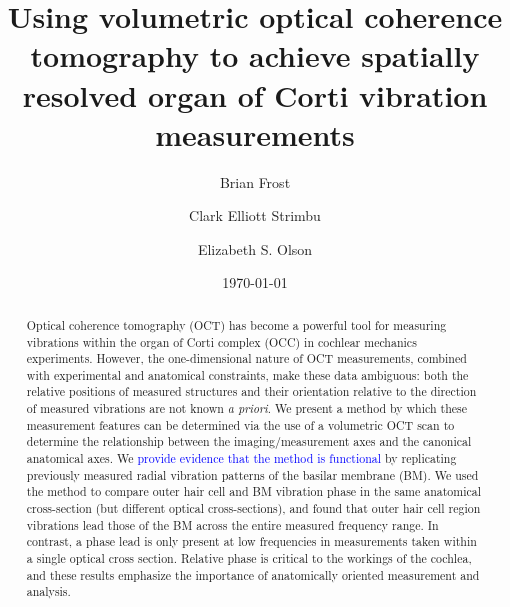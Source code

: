 \documentclass[preprint,NumberedRefs]{JASA}
\begin{document}
\title[Spatially resolved organ of Corti vibrometry]{Using volumetric optical coherence tomography to achieve spatially resolved organ of Corti vibration measurements}
\author{Brian Frost}
\author{Clark Elliott Strimbu}
\author{Elizabeth S. Olson}


\date{\today} 


\begin{abstract}
Optical coherence tomography (OCT) has become a powerful tool for measuring vibrations within the organ of Corti complex (OCC) in cochlear mechanics experiments. However, the one-dimensional nature of OCT measurements, combined with experimental and anatomical constraints, make these data ambiguous: both the relative positions of measured structures and their orientation relative to the direction of measured vibrations are not known \textit{a priori}. We present a method by which these measurement features can be determined via the use of a volumetric OCT scan to determine the relationship between the imaging/measurement axes and the canonical anatomical axes. We \textcolor{blue}{provide evidence that the method is functional} by replicating previously measured radial vibration patterns of the basilar membrane (BM).  We used the method to compare outer hair cell and BM vibration phase in the same anatomical cross-section (but different optical cross-sections), and found that outer hair cell region vibrations lead those of the BM across the entire measured frequency range. In contrast, a phase lead is only present at low frequencies in measurements taken within a single optical cross section. Relative phase is critical to the workings of the cochlea, and these results emphasize the importance of anatomically oriented measurement and analysis. 
\end{abstract}


\maketitle
\end{document}
